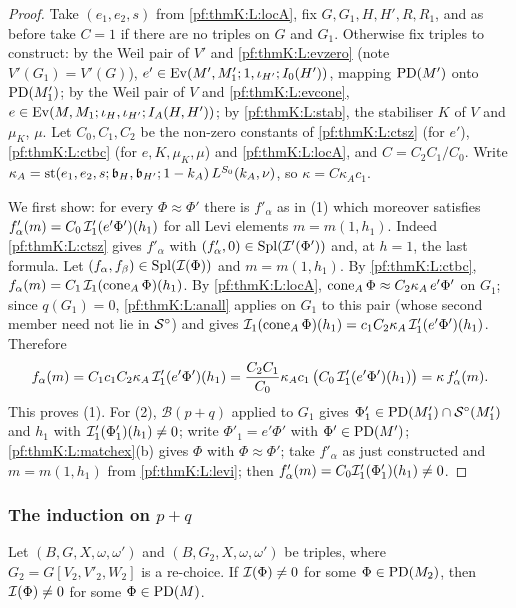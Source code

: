 \begin{proof}
Take $(e_1,e_2,s)$ from \ref{pf:thmK:L:locA}, fix $G,G_1,H,H',R,R_1$, and as before take $C=1$ if there are no triples on
$G$ and $G_1$. Otherwise fix triples to construct: by the Weil pair of $V'$ and \ref{pf:thmK:L:evzero} (note
$V'(G_1)=V'(G)$), $e'\in\operatorname{Ev}(M',M'_1;1,\iota_{H'};I_0(H'))$, mapping $\operatorname{PD}(M')$ onto $\operatorname{PD}(M'_1)$; by the Weil pair of
$V$ and \ref{pf:thmK:L:evcone}, $e\in\operatorname{Ev}(M,M_1;\iota_H,\iota_{H'};I_A(H,H'))$; by \ref{pf:thmK:L:stab}, the stabiliser
$K$ of $V$ and $\mu_K$, $\mu$. Let $C_0,C_1,C_2$ be the non-zero constants of \ref{pf:thmK:L:ctsz} (for $e'$),
\ref{pf:thmK:L:ctbc} (for $e,K,\mu_K,\mu$) and \ref{pf:thmK:L:locA}, and $C=C_2C_1/C_0$. Write
$\kappa_A=\operatorname{st}(e_1,e_2,s;\mathfrak b_H,\mathfrak b_{H'};1-k_A)\,L^{S_0}(k_A,\nu)$, so $\kappa=C\kappa_Ac_1$.

We first show: for every $\Phi\approx\Phi'$ there is $f'_\alpha$ as in (1) which moreover satisfies
$f'_\alpha(m)=C_0\,\mathcal{I}'_1(e'\Phi')(h_1)$ for all Levi elements $m=m(1,h_1)$. Indeed \ref{pf:thmK:L:ctsz} gives
$f'_\alpha$ with $(f'_\alpha,0)\in\operatorname{Spl}(\mathcal{I}'(\Phi'))$ and, at $h=1$, the last formula. Let
$(f_\alpha,f_\beta)\in\operatorname{Spl}(\mathcal{I}(\Phi))$ and $m=m(1,h_1)$. By \ref{pf:thmK:L:ctbc}, $f_\alpha(m)=C_1\,
\mathcal{I}_1(\operatorname{cone}_A\Phi)(h_1)$. By \ref{pf:thmK:L:locA}, $\operatorname{cone}_A\Phi\approx C_2\kappa_A\,e'\Phi'$ on $G_1$; since
$q(G_1)=0$, \ref{pf:thmK:L:anall} applies on $G_1$ to this pair (whose second member need not lie in $\mathcal{S}^{\circ}$) and gives
$\mathcal{I}_1(\operatorname{cone}_A\Phi)(h_1)=c_1C_2\kappa_A\,\mathcal{I}'_1(e'\Phi')(h_1)$. Therefore
\[
f_\alpha(m)=C_1c_1C_2\kappa_A\,\mathcal{I}'_1(e'\Phi')(h_1)=\frac{C_2C_1}{C_0}\kappa_Ac_1\,\bigl(C_0\,\mathcal{I}'_1(e'\Phi')(h_1)\bigr)
=\kappa\,f'_\alpha(m).
\]
This proves (1). For (2), $\mathcal B(p+q)$ applied to $G_1$ gives $\Phi'_1\in\operatorname{PD}(M'_1)\cap\mathcal{S}^{\circ}(M'_1)$ and $h_1$ with
$\mathcal{I}'_1(\Phi'_1)(h_1)\ne0$; write $\Phi'_1=e'\Phi'$ with $\Phi'\in\operatorname{PD}(M')$; \ref{pf:thmK:L:matchex}(b) gives $\Phi$ with
$\Phi\approx\Phi'$; take $f'_\alpha$ as just constructed and $m=m(1,h_1)$ from \ref{pf:thmK:L:levi}; then
$f'_\alpha(m)=C_0\mathcal{I}'_1(\Phi'_1)(h_1)\ne0$.
\end{proof}

\subsubsection{The induction on $p+q$}

\begin{lemma}\label{pf:thmK:nzmove}
Let $(B,G,X,\omega,\omega')$ and $(B,G_2,X,\omega,\omega')$ be triples, where $G_2=G[V_2,V'_2,W_2]$ is a re-choice. If
$\mathcal{I}(\Phi)\ne0$ for some $\Phi\in\operatorname{PD}(M_2)$, then $\mathcal{I}(\Phi)\ne0$ for some $\Phi\in\operatorname{PD}(M)$.
\end{lemma}

